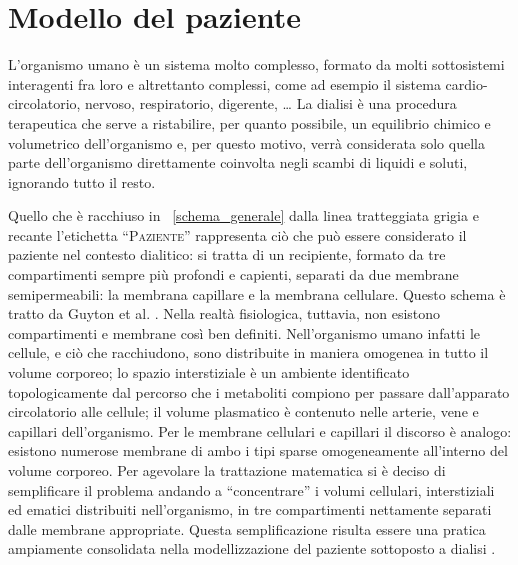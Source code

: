 \section{Modello del paziente}
L'organismo umano è un sistema molto complesso, formato da molti sottosistemi interagenti fra loro e altrettanto complessi, come ad esempio il sistema cardio-circolatorio, nervoso, respiratorio, digerente, \ldots
La dialisi è una procedura terapeutica che serve a ristabilire, per quanto possibile, un equilibrio chimico e volumetrico dell'organismo e, per questo motivo, verrà considerata solo quella parte dell'organismo direttamente coinvolta negli scambi di liquidi e soluti, ignorando tutto il resto.

Quello che è racchiuso in \figurename~\ref{schema_generale} dalla linea tratteggiata grigia e recante l'etichetta ``\textsc{Paziente}'' rappresenta ciò che può essere considerato il paziente nel contesto dialitico: si tratta di un recipiente, formato da tre compartimenti sempre più profondi e capienti, separati da due membrane semipermeabili: la membrana capillare e la membrana cellulare. Questo schema è tratto da Guyton et al. \cite{guyton}. Nella realtà fisiologica, tuttavia, non esistono compartimenti e membrane così ben definiti. Nell'organismo umano infatti le cellule, e ciò che racchiudono, sono distribuite in maniera omogenea in tutto il volume corporeo; lo spazio interstiziale è un ambiente identificato topologicamente dal percorso che i metaboliti compiono per passare dall'apparato circolatorio alle cellule; il volume plasmatico è contenuto nelle arterie, vene e capillari dell'organismo. Per le membrane cellulari e capillari il discorso è analogo: esistono numerose membrane di ambo i tipi sparse omogeneamente all'interno del volume corporeo. Per agevolare la trattazione matematica si è deciso di semplificare il problema andando a ``concentrare'' i volumi cellulari, interstiziali ed ematici distribuiti nell'organismo, in tre compartimenti nettamente separati dalle membrane appropriate. Questa semplificazione risulta essere una pratica ampiamente consolidata nella modellizzazione del paziente sottoposto a dialisi \cite{casagrande, gatti, ursino}.

